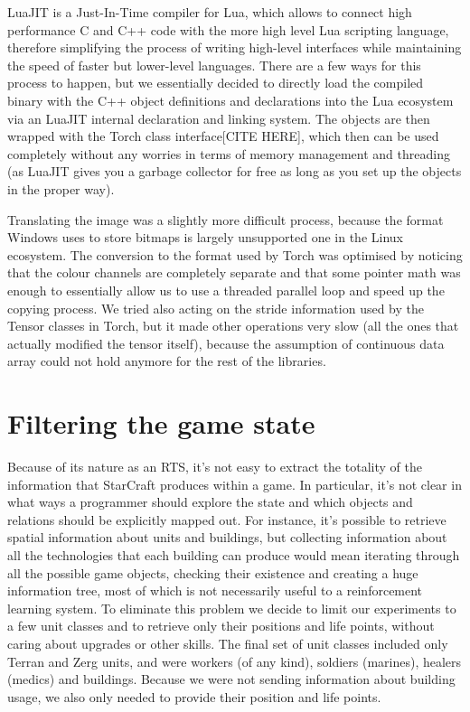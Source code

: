 \documentclass[bsc,frontabs,twoside,parskip,deptreport]{infthesis}     %
\begin{document}
LuaJIT is a Just-In-Time compiler for Lua, which allows to connect high
performance C and C++ code with the more high level Lua scripting language,
therefore simplifying the process of writing high-level interfaces while
maintaining the speed of faster but lower-level languages. There are a few ways
for this process to happen, but we essentially decided to directly load the
compiled binary with the C++ object definitions and declarations into the Lua
ecosystem via an LuaJIT internal declaration and linking system. The objects are
then wrapped with the Torch class interface[CITE HERE], which then can be used
completely without any worries in terms of memory management and threading (as
LuaJIT gives you a garbage collector for free as long as you set up the objects
in the proper way).

Translating the image was a slightly more difficult process, because the format
Windows uses to store bitmaps is largely unsupported one in the Linux ecosystem.
The conversion to the format used by Torch was optimised by noticing that the
colour channels are completely separate and that some pointer math was enough to
essentially allow us to use a threaded parallel loop and speed up the copying
process. We tried also acting on the stride information used by the Tensor
classes in Torch, but it made other operations very slow (all the ones that
actually modified the tensor itself), because the assumption of continuous data
array could not hold anymore for the rest of the libraries.

\section{Filtering the game state}

Because of its nature as an RTS, it's not easy to extract the totality of the
information that StarCraft produces within a game. In particular, it's not clear
in what ways a programmer should explore the state and which objects and
relations should be explicitly mapped out. For instance, it's possible to
retrieve spatial information about units and buildings, but collecting
information about all the technologies that each building can produce would mean
iterating through all the possible game objects, checking their existence and
creating a huge information tree, most of which is not necessarily useful to a
reinforcement learning system. To eliminate this problem we decide to limit our
experiments to a few unit classes and to retrieve only their positions and life
points, without caring about upgrades or other skills. The final set of unit
classes included only Terran and Zerg units, and were workers (of any kind),
soldiers (marines), healers (medics) and buildings. Because we were not sending
information about building usage, we also only needed to provide their position
and life points.
\end{document}
